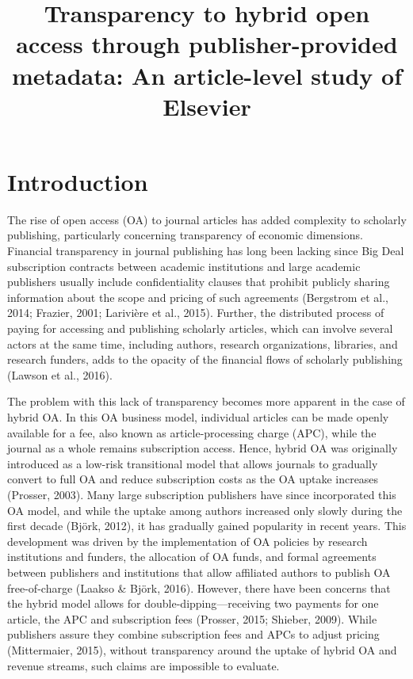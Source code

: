 \documentclass[a4paper,man,floatsintext,longtable,noextraspace,12pt]{apa6}
\title{\textbf{Transparency to hybrid open access  through publisher-provided metadata: An article-level study of Elsevier}}
\begin{document}
\maketitle

\hypertarget{introduction}{%
\section{Introduction}\label{introduction}}

The rise of open access (OA) to journal articles has added complexity to
scholarly publishing, particularly concerning transparency of economic
dimensions. Financial transparency in journal publishing has long been
lacking since Big Deal subscription contracts between academic
institutions and large academic publishers usually include
confidentiality clauses that prohibit publicly sharing information about
the scope and pricing of such agreements (Bergstrom et al., 2014;
Frazier, 2001; Larivière et al., 2015). Further, the distributed process
of paying for accessing and publishing scholarly articles, which can
involve several actors at the same time, including authors, research
organizations, libraries, and research funders, adds to the opacity of
the financial flows of scholarly publishing (Lawson et al., 2016).

The problem with this lack of transparency becomes more apparent in the
case of hybrid OA. In this OA business model, individual articles can be
made openly available for a fee, also known as article-processing charge
(APC), while the journal as a whole remains subscription access. Hence,
hybrid OA was originally introduced as a low-risk transitional model
that allows journals to gradually convert to full OA and reduce
subscription costs as the OA uptake increases (Prosser, 2003). Many
large subscription publishers have since incorporated this OA model, and
while the uptake among authors increased only slowly during the first
decade (Björk, 2012), it has gradually gained popularity in recent
years. This development was driven by the implementation of OA policies
by research institutions and funders, the allocation of OA funds, and
formal agreements between publishers and institutions that allow
affiliated authors to publish OA free-of-charge (Laakso \& Björk, 2016).
However, there have been concerns that the hybrid model allows for
double-dipping---receiving two payments for one article, the APC and
subscription fees (Prosser, 2015; Shieber, 2009). While publishers
assure they combine subscription fees and APCs to adjust pricing
(Mittermaier, 2015), without transparency around the uptake of hybrid OA
and revenue streams, such claims are impossible to evaluate.
\end{document}
